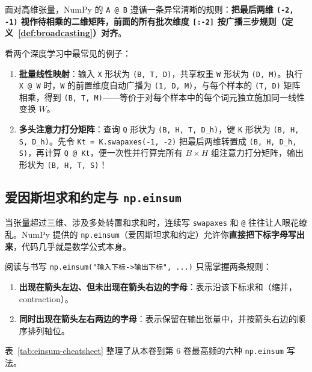 面对高维张量，NumPy 的 \texttt{A @ B} 遵循一条异常清晰的规则：\textbf{把最后两维 \texttt{(-2, -1)} 视作待相乘的二维矩阵，前面的所有批次维度 \texttt{[:-2]} 按广播三步规则（定义~\ref{def:broadcasting}）对齐}。

看两个深度学习中最常见的例子：
\begin{enumerate}
  \item \textbf{批量线性映射}：输入 \texttt{X} 形状为 \texttt{(B, T, D)}，共享权重 \texttt{W} 形状为 \texttt{(D, M)}。执行 \texttt{X @ W} 时，\texttt{W} 的前置维度自动广播为 \texttt{(1, D, M)}，与每个样本的 \texttt{(T, D)} 矩阵相乘，得到 \texttt{(B, T, M)}——等价于对每个样本中的每个词元独立施加同一线性变换 $W$。
  \item \textbf{多头注意力打分矩阵}：查询 \texttt{Q} 形状为 \texttt{(B, H, T, D\_h)}，键 \texttt{K} 形状为 \texttt{(B, H, S, D\_h)}。先令 \texttt{Kt = K.swapaxes(-1, -2)} 把最后两维转置成 \texttt{(B, H, D\_h, S)}，再计算 \texttt{Q @ Kt}，便一次性并行算完所有 $B \times H$ 组注意力打分矩阵，输出形状为 \texttt{(B, H, T, S)}！
\end{enumerate}

\subsection{爱因斯坦求和约定与 \texttt{np.einsum}}

当张量超过三维、涉及多处转置和求和时，连续写 \texttt{swapaxes} 和 \texttt{@} 往往让人眼花缭乱。NumPy 提供的 \texttt{np.einsum}（爱因斯坦求和约定）允许你\textbf{直接把下标字母写出来}，代码几乎就是数学公式本身。

阅读与书写 \texttt{np.einsum("输入下标->输出下标", ...)} 只需掌握两条规则：
\begin{enumerate}
  \item \textbf{出现在箭头左边、但未出现在箭头右边的字母}：表示沿该下标求和（缩并，contraction）。
  \item \textbf{同时出现在箭头左右两边的字母}：表示保留在输出张量中，并按箭头右边的顺序排列轴位。
\end{enumerate}

表~\ref{tab:einsum-cheatsheet} 整理了从本卷到第 6 卷最高频的六种 \texttt{np.einsum} 写法。

